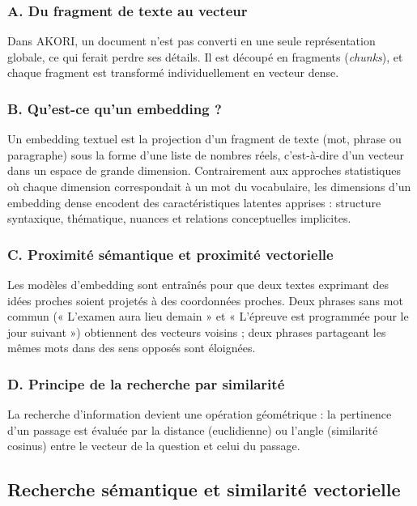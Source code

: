 \documentclass[12pt,a4paper,oneside]{report}
\begin{document}
\subsubsection*{A. Du fragment de texte au vecteur}

Dans AKORI, un document n'est pas converti en une seule représentation globale, ce qui ferait perdre ses détails. Il est découpé en fragments (\emph{chunks}), et chaque fragment est transformé individuellement en vecteur dense.

\subsubsection*{B. Qu'est-ce qu'un embedding ?}

Un embedding textuel est la projection d'un fragment de texte (mot, phrase ou paragraphe) sous la forme d'une liste de nombres réels, c'est-à-dire d'un vecteur dans un espace de grande dimension. Contrairement aux approches statistiques où chaque dimension correspondait à un mot du vocabulaire, les dimensions d'un embedding dense encodent des caractéristiques latentes apprises : structure syntaxique, thématique, nuances et relations conceptuelles implicites.

\subsubsection*{C. Proximité sémantique et proximité vectorielle}

Les modèles d'embedding sont entraînés pour que deux textes exprimant des idées proches soient projetés à des coordonnées proches. Deux phrases sans mot commun (« L'examen aura lieu demain » et « L'épreuve est programmée pour le jour suivant ») obtiennent des vecteurs voisins ; deux phrases partageant les mêmes mots dans des sens opposés sont éloignées.

\subsubsection*{D. Principe de la recherche par similarité}

La recherche d'information devient une opération géométrique : la pertinence d'un passage est évaluée par la distance (euclidienne) ou l'angle (similarité cosinus) entre le vecteur de la question et celui du passage.

\subsection{Recherche sémantique et similarité vectorielle}
\end{document}
